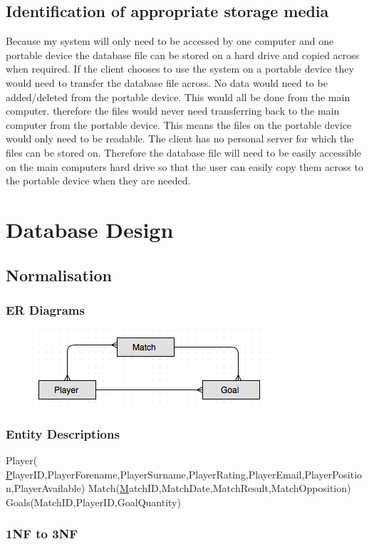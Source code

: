 \subsection{Identification of appropriate storage media}
Because my system will only need to be accessed by one computer and one portable device the database file can be stored on a hard drive and copied across when required. If the client chooses to use the system on a portable device  they would need to transfer the database file across. No data would need to be added/deleted from the portable device. This would all be done from the main computer. therefore the files would never need transferring back to the main computer from the portable device. This means the files on the portable device would only need to be readable. The client has no personal server for which the files can be stored on. Therefore the database file will need to be easily accessible on the main computers hard drive so that the user can easily copy them across to the portable device when they are needed. 
\section{Database Design}

\subsection{Normalisation}

\subsubsection{ER Diagrams}
\begin{figure}[H]
	\includegraphics{ER}
\end{figure}

\subsubsection{Entity Descriptions}
Player( {\ul PlayerID},PlayerForename,PlayerSurname,PlayerRating,PlayerEmail,PlayerPosition,PlayerAvailable)
Match({\ul MatchID},MatchDate,MatchResult,MatchOpposition)
Goals(MatchID,PlayerID,GoalQuantity)
\subsubsection{1NF to 3NF}

